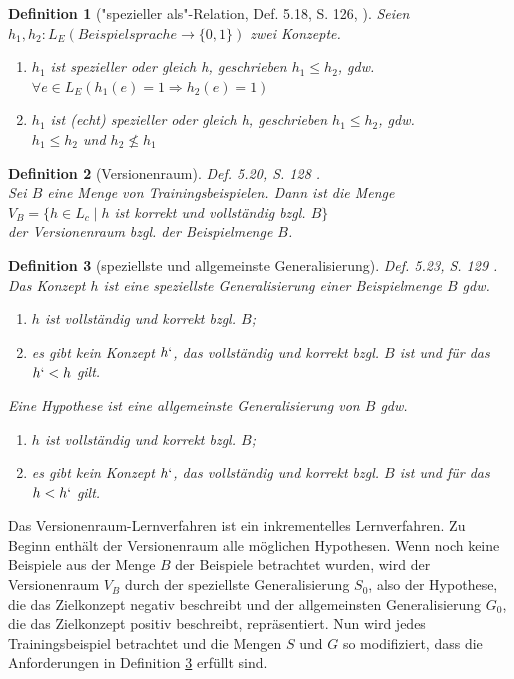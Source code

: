 \documentclass[a4paper, 11pt]{book}
\newtheorem{Def}{Definition }[section]
\begin{document}
{\begin{Def}["{}spezieller als"{}-Relation, Def. 5.18, S. 126, \cite{BKI08}]
	Seien \\ $ h_1, h_2 : L_E (Beispielsprache \rightarrow \{0,1\}) $ zwei Konzepte.
	\begin{enumerate}
		\item $ h_1 $ ist spezieller oder gleich h, geschrieben $ h_1 \le h_2 $, gdw. \\
		$ \forall e \in L_E(h_1(e) = 1 \Rightarrow h_2(e) = 1) $
			\item $ h_1 $ ist (echt) spezieller oder gleich h, geschrieben $ h_1 \leq h_2 $, gdw. \\
		$ h_1 \leq h_2 $ und $ h_2 \not \le h_1 $
	\end{enumerate} 
\end{Def}
\begin{Def}[Versionenraum] 
	Def. 5.20, S. 128 \cite{BKI08}.\\
	Sei $ B $ eine Menge von Trainingsbeispielen. Dann ist die Menge\\
	$ V_B = \{h \in L_ c \mid h $  ist korrekt und vollständig bzgl. $ B \} $\\
	der Versionenraum bzgl. der Beispielmenge $ B $.
\end{Def}
\begin{Def}[speziellste und allgemeinste Generalisierung] Def. 5.23, S. 129 \cite{BKI08}. \label{spezGen}
Das Konzept  $ h $ ist eine speziellste Generalisierung einer Beispielmenge $ B $ gdw.
\begin{enumerate}
	\item $ h $ ist vollständig und korrekt bzgl. $ B $;
	\item es gibt kein Konzept $ h` $, das vollständig und korrekt bzgl. $ B $ ist und für das $ h` <  h $ gilt.
\end{enumerate}
Eine Hypothese ist eine allgemeinste Generalisierung von $ B $ gdw.
\begin{enumerate}
	\item $ h $ ist vollständig und korrekt bzgl. $ B $;
	\item es gibt kein Konzept $ h` $, das vollständig und korrekt bzgl. $ B $ ist und für das $ h <  h` $ gilt.
\end{enumerate}
\end{Def}
Das Versionenraum-Lernverfahren ist ein inkrementelles Lernverfahren. Zu Beginn enthält der Versionenraum alle möglichen Hypothesen. Wenn noch keine Beispiele aus der Menge $ B $ der Beispiele betrachtet wurden, wird der Versionenraum $ V_B $ durch der speziellste Generalisierung $ S_0 $, also der Hypothese, die das Zielkonzept negativ beschreibt und der allgemeinsten Generalisierung $ G_0 $, die das Zielkonzept positiv beschreibt, repräsentiert. Nun wird jedes Trainingsbeispiel betrachtet und die Mengen $ S $ und $ G $ so modifiziert, dass die Anforderungen in Definition \ref{spezGen} erfüllt sind.


}
\end{document}
